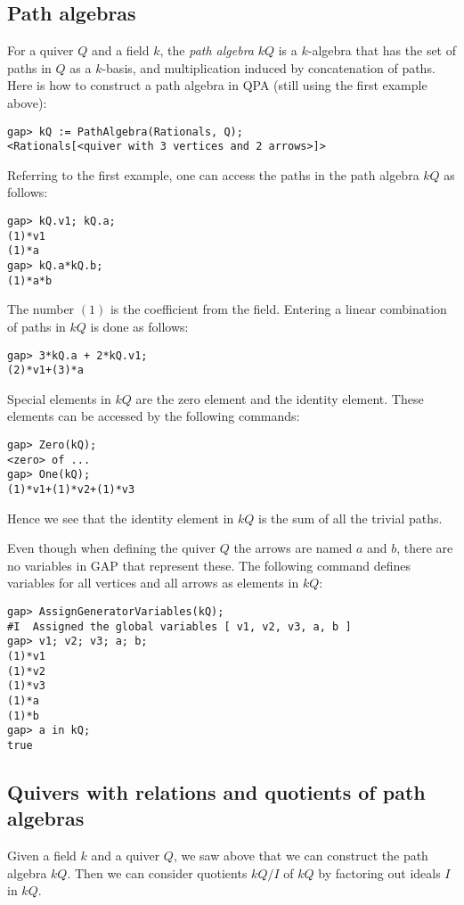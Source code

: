 \documentclass{amsart}
\theoremstyle{definition}
\theoremstyle{theoretic}
\begin{document}
\subsection{Path algebras} %

For a quiver $Q$ and a field $k$, the \emph{path algebra} $kQ$ is a
$k$-algebra that has the set of paths in $Q$ as a $k$-basis, and
multiplication induced by concatenation of paths.  Here is
how to construct a path algebra in QPA (still using the first example
above): 
\begin{verbatim}
gap> kQ := PathAlgebra(Rationals, Q);
<Rationals[<quiver with 3 vertices and 2 arrows>]>
\end{verbatim}
Referring to the first example, one can access the paths in the path
algebra $kQ$ as follows:
\begin{verbatim}
gap> kQ.v1; kQ.a; 
(1)*v1
(1)*a
gap> kQ.a*kQ.b;
(1)*a*b
\end{verbatim}
The number $(1)$ is the coefficient from the field.  Entering a linear
combination of paths in $kQ$ is done as follows:
\begin{verbatim}
gap> 3*kQ.a + 2*kQ.v1;
(2)*v1+(3)*a
\end{verbatim} 
Special elements in $kQ$ are the zero element and the identity
element.  These elements can be accessed by the following commands:
\begin{verbatim}
gap> Zero(kQ);
<zero> of ...
gap> One(kQ);
(1)*v1+(1)*v2+(1)*v3
\end{verbatim}
Hence we see that the identity element in $kQ$ is the sum of all the
trivial paths. 

Even though when defining the quiver $Q$ the arrows are named $a$ and
$b$, there are no variables in GAP that represent these.  The
following command defines variables for all vertices and all
arrows as elements in $kQ$:
\begin{verbatim}
gap> AssignGeneratorVariables(kQ);
#I  Assigned the global variables [ v1, v2, v3, a, b ]
gap> v1; v2; v3; a; b;
(1)*v1
(1)*v2
(1)*v3
(1)*a
(1)*b
gap> a in kQ;
true
\end{verbatim}

\subsection{Quivers with relations and quotients of path algebras}

Given a field $k$ and a quiver $Q$, we saw above that we can construct
the path algebra $kQ$.  Then we can consider quotients $kQ/I$ of $kQ$
by factoring out ideals $I$ in $kQ$.  
\end{document}
